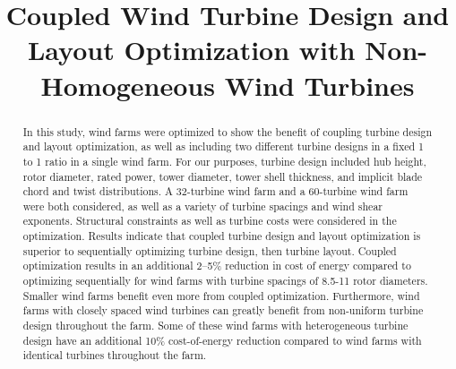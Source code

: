 \documentclass[WESD, manuscript]{copernicus}
\begin{document}
\title{Coupled Wind Turbine Design and Layout Optimization with Non-Homogeneous Wind Turbines}








\received{}
\pubdiscuss{} 
\revised{}
\accepted{}
\published{}




\maketitle



\begin{abstract}
In this study, wind farms were optimized to show the benefit of coupling turbine design and layout optimization, as well as including two different turbine designs in a fixed 1 to 1 ratio in a single wind farm. For our purposes, turbine design included hub height, rotor diameter, rated power, tower diameter, tower shell thickness, and implicit blade chord and twist distributions. A 32-turbine wind farm and a 60-turbine wind farm were both considered, as well as a variety of turbine spacings and wind shear exponents. Structural constraints as well as turbine costs were considered in the optimization. Results indicate that coupled turbine design and layout optimization is superior to sequentially optimizing turbine design, then turbine layout. Coupled optimization results in an additional  2--5\% reduction in cost of energy compared to optimizing sequentially for wind farms with turbine spacings of 8.5-11 rotor diameters. Smaller wind farms benefit even more from coupled optimization. Furthermore, wind farms with closely spaced wind turbines can greatly benefit from non-uniform turbine design throughout the farm. Some of these wind farms with heterogeneous turbine design have an additional 10\% cost-of-energy reduction compared to wind farms with identical turbines throughout the farm.
\end{abstract}
\end{document}
